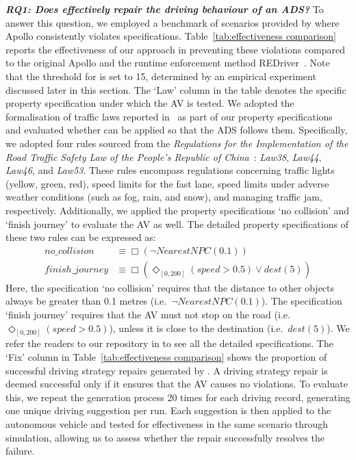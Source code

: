 \noindent \emph{\textbf {RQ1: Does \coolname effectively repair the driving behaviour of an ADS?}}
To answer this question, we employed a benchmark of scenarios provided by \cite{wang2024mudrive} where Apollo consistently violates specifications. 
Table~\ref{tab:effectiveness comparison} reports the effectiveness of our approach in preventing these violations compared to the original Apollo and the runtime enforcement method REDriver~\cite{sun2024redriver}. Note that the threshold for \coolname is set to 15, determined by an empirical experiment discussed later in this section.
The `Law' column in the table denotes the specific property specification under which the AV is tested. 
We adopted the formalisation of traffic laws reported in~\cite{Sun-Poskitt-et_al22a} as part of our property specifications and evaluated whether \coolname can be applied so that the ADS follows them. 
Specifically, we adopted four rules sourced from the \emph{Regulations for the Implementation of the Road Traffic Safety Law of the People's Republic of China}~\cite{China_traffic_law}: \emph{Law38}, \emph{Law44}, \emph{Law46}, and \emph{Law53}. These rules encompass regulations concerning traffic lights (yellow, green, red), speed limits for the fast lane, speed limits under adverse weather conditions (such as fog, rain, and snow), and managing traffic jam, respectively.
Additionally, we applied the property specifications `no collision' and `finish journey' to evaluate the AV as well. The detailed property specifications of these two rules can be expressed as: 
\vspace{-15pt}\begin{align*}
    no\_collision & \equiv \Box (\lnot NearestNPC(0.1)) \\
     finish\_journey & \equiv  \Box (\Diamond_{[0,200]}(speed > 0.5) \lor dest(5)) 
\end{align*}
Here, the specification `no collision' requires that the distance to other objects always be greater than 0.1 metres (i.e.~$\lnot NearestNPC(0.1)$). The specification `finish journey' requires that the AV must not stop on the road (i.e.~$\Diamond_{[0,200]}(speed > 0.5)$), unless it is close to the destination (i.e.~$dest(5)$). 
We refer the readers to our repository in \cite{source_code}
to see all the detailed specifications.
The `Fix' column in Table~\ref{tab:effectiveness comparison} shows the proportion of successful driving strategy repairs generated by \coolname. A driving strategy repair is deemed successful only if it ensures that the AV causes no violations.
To evaluate this, we repeat the generation process 20 times for each driving record, generating one unique driving suggestion per run. Each suggestion is then applied to the autonomous vehicle and tested for effectiveness in the same scenario through simulation, allowing us to assess whether the repair successfully resolves the failure.
